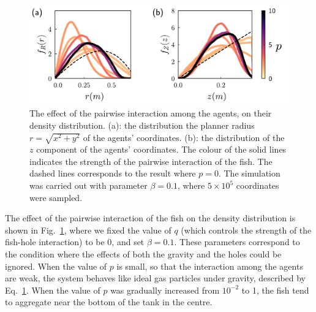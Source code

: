 \documentclass[11pt,twoside]{report}
\begin{document}
\begin{figure}
  \includegraphics[width=\linewidth]{density-interaction}
  \caption[The effect of the pairwise interaction on the density distribution]{
  The effect of the pairwise interaction among the agents, on their density distribution.
  (a): the distribution the planner radius $r=\sqrt{x^2 + y^2}$ of the agents' coordinates.
  (b): the distribution of the $z$ component of the agents' coordinates.
  The colour of the solid lines indicates the strength of the pairwise interaction of the fish. The dashed lines corresponds to the result where $p=0$. The simulation was carried out with parameter $\beta=0.1$, where $5 \times 10^{5}$ coordinates were sampled.
  }
  \label{fig:dist-interaction}
\end{figure}

The effect of the pairwise interaction of the fish on the density distribution is shown in Fig.~\ref{fig:dist-interaction}, where we fixed the value of $q$ (which controls the strength of the fish-hole interaction) to be $0$, and set $\beta=0.1$. These parameters correspond to the condition where the effects of both the gravity and the holes could be ignored.
When the value of $p$ is small, so that the interaction among the agents are weak, the system behaves like ideal gas particles under gravity, described by Eq.~\ref{fig:dist-interaction}. When the value of $p$ was gradually increased from $10^{-2}$ to 1, the fish tend to aggregate near the bottom of the tank in the centre.

\end{document}
